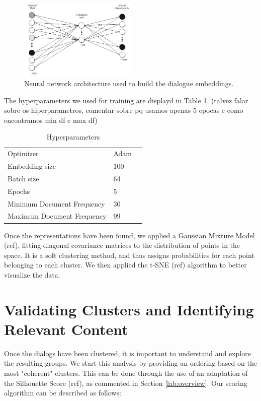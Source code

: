 \documentclass[11pt,a4paper]{article}
\begin{document}
\begin{figure}
    \centering
    \includegraphics[width=0.5\textwidth]{figures/Embedding.png}
    \caption{Neural network architecture used to build the dialogue embeddings.}
    \label{fig:embedding}
\end{figure}

The hyperparameters we used for training are displayd in Table \ref{tab:hyper}. (talvez falar sobre os hiperparametros, comentar sobre pq usamos apenas 5 epocas e como encontramos min df e max df)

\begin{table}[]
\begin{tabular}{lll}
Optimizer & Adam   \\
Embedding size  &   100     \\
Batch size      &   64   \\
Epochs & 5\\
Minimum Document Frequency & 30\\
Maximum Document Frequency & 99
\end{tabular}
\caption{Hyperparameters}
\label{tab:hyper}
\end{table}

Once the representations have been found, we applied a Gaussian Mixture Model (ref), fitting diagonal covariance matrices to the distribution of points in the space. It is a soft clustering method, and thus assigns probabilities for each point belonging to each cluster. We then applied the t-SNE (ref) algorithm to better visualize the data. 

\section{Validating Clusters and Identifying Relevant Content}

Once the dialogs have been clustered, it is important to understand and explore the resulting groups. We start this analysis by providing an ordering based on the most "coherent" clusters. This can be done through the use of an adaptation of the Silhouette Score (ref), as commented in Section \ref{lab:overview}. Our scoring algorithm can be described as follows:
\end{document}
